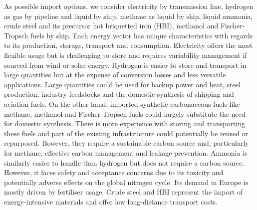 
As possible import options, we consider electricity by transmission line,
hydrogen as gas by pipeline and liquid by ship, methane as liquid by ship,
liquid ammonia, crude steel and its precursor hot briquetted iron (HBI), methanol and
Fischer-Tropsch fuels by ship. Each energy vector has unique characteristics
with regards to its production, storage, transport and consumption. Electricity offers
the most flexible usage but is challenging to store and requires variability
management if sourced from wind or solar energy. Hydrogen is easier to store and
transport in large quantities but at the expense of conversion losses and less
versatile applications. Large quantities could be used for backup power and
heat, steel production, industry feedstocks and the domestic synthesis of
shipping and aviation fuels. On the other hand, imported synthetic carbonaceous
fuels like methane, methanol and Fischer-Tropsch fuels could largely substitute
the need for domestic synthesis. There is more experience with storing and
transporting these fuels and part of the existing infrastructure could
potentially be reused or repurposed. However, they require a sustainable carbon
source and, particularly for methane, effective carbon management and leakage
prevention.\cite{shirizadehImpactMethaneLeakage2023} Ammonia is similarly easier
to handle than hydrogen but does not require a carbon source. However, it faces
safety and acceptance concerns due to its toxicity and potentially adverse
effects on the global nitrogen
cycle.\cite{bertagniMinimizingImpactsAmmonia2023,wolframUsingAmmoniaShipping2022}
Its demand in Europe is mostly driven by fertiliser usage. Crude steel and HBI
represent the import of energy-intensive materials and offer low long-distance
transport costs.



